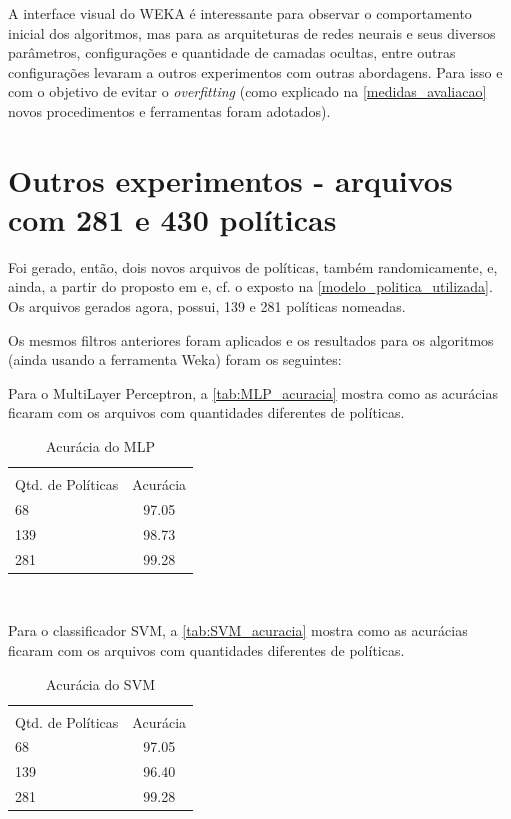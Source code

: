 A interface visual do WEKA é interessante para observar o comportamento inicial dos algoritmos, mas para as arquiteturas de redes neurais e seus diversos parâmetros, configurações e quantidade de camadas ocultas, entre outras configurações levaram a outros experimentos com outras abordagens. Para isso e com o objetivo de evitar o \textit{overfitting} (como explicado na \autoref{medidas_avaliacao} novos procedimentos e ferramentas foram adotados).

\section{Outros experimentos - arquivos com 281 e 430 políticas}\label{exp:139-281}
Foi gerado, então, dois novos arquivos de políticas, também randomicamente, e, ainda, a partir do proposto em  e, cf. o exposto na \autoref{modelo_politica_utilizada}. Os arquivos gerados agora, possui, 139  e 281 políticas nomeadas.

Os mesmos filtros anteriores foram aplicados e os resultados para os algoritmos (ainda usando a ferramenta Weka) foram os seguintes:

Para o MultiLayer Perceptron, a \autoref{tab:MLP_acuracia} mostra como as acurácias ficaram com os arquivos com quantidades diferentes de políticas.

\begin{table}[h!]
	\centering
	\caption{Acurácia do MLP}
	\label{tab:MLP_acuracia}
	\vspace{0.3cm}
	\begin{tabular}{p{6cm}c}
		\hline\\
		Qtd. de Políticas	& Acurácia  \\[10pt] 
		\hline
		68 					& 97.05    	\\
		139			     	& 98.73     \\
		281					& 99.28		\\
		\hline
	\end{tabular}
	\\[6pt]		
\end{table}

Para o classificador SVM, a \autoref{tab:SVM_acuracia} mostra como as acurácias ficaram com os arquivos com quantidades diferentes de políticas.

\begin{table}[h!]
	\centering
	\caption{Acurácia do SVM}
	\label{tab:SVM_acuracia}
	\vspace{0.3cm}
	\begin{tabular}{p{6cm}c}
		\hline\\
		Qtd. de Políticas	& Acurácia  \\[10pt] 
		\hline
		68 					& 97.05    	\\
		139			     	& 96.40     \\
		281					& 99.28		\\
		\hline
	\end{tabular}
	\\[6pt]		
\end{table}

